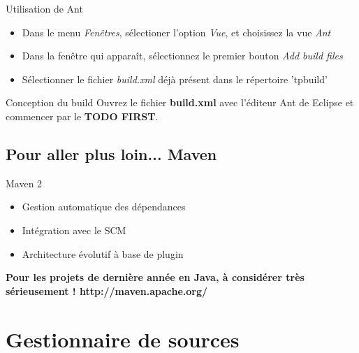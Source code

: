 \documentclass[handout]{beamer}
\begin{document}
\begin{frame}
	\begin{block}{Utilisation de Ant}
		\begin{itemize}
			\item Dans le menu \textit{Fenêtres}, sélectioner l'option \textit{Vue}, et choisissez la vue \textit{Ant}
			\item Dans la fenêtre qui apparaît, sélectionnez le premier bouton \textit{Add build files}
			\item Sélectionner le fichier \textit{build.xml} déjà présent dans le répertoire 'tpbuild'
		\end{itemize}
	\end{block}

	\begin{block}{Conception du build}
	 	Ouvrez le fichier \textbf{build.xml} avec l'éditeur Ant de Eclipse et commencer par le \textbf{TODO FIRST}.
	\end{block} 
\end{frame}

\subsection{Pour aller plus loin... Maven}
\begin{frame}
	\begin{block}{Maven 2}
		\begin{itemize}
			\item Gestion automatique des dépendances
			\item Intégration avec le SCM
			\item Architecture évolutif à base de plugin
		\end{itemize}
		\begin{center}
			\textbf{Pour les projets de dernière année en Java, à considérer très sérieusement ! http://maven.apache.org/}
		\end{center}
	\end{block}
\end{frame}


\section{Gestionnaire de sources}
\end{document}
